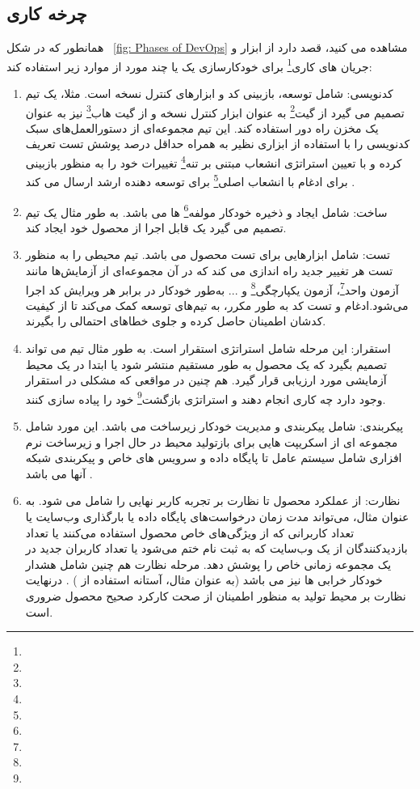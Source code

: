 \subsection{چرخه کاری }
همانطور که در شکل 
~\ref{fig: Phases of DevOps}
مشاهده می کنید،
قصد دارد از ابزار و جریان های کاری\footnote{} برای خودکارسازی یک یا چند مورد از موارد زیر استفاده کند: 
\begin{enumerate}
	\item
کدنویسی: شامل توسعه، بازبینی کد و ابزارهای کنترل نسخه است. مثلا، یک تیم تصمیم می گیرد از گیت\footnote{} به عنوان ابزار کنترل نسخه و از گیت هاب\footnote{} نیز به عنوان یک مخزن راه دور استفاده کند. این تیم مجموعه‌ای از دستورالعمل‌های سبک کدنویسی را با استفاده از ابزاری نظیر  به همراه حداقل درصد پوشش تست تعریف کرده و با تعیین استراتژی انشعاب مبتنی بر تنه\footnote{} تغییرات خود را به منظور بازبینی برای ادغام با انشعاب اصلی\footnote{} برای توسعه دهنده ارشد ارسال می کند \cite{Devopstrunk}.
	\item 
ساخت: شامل ایجاد و ذخیره خودکار مولفه\footnote{} ها می باشد. به طور مثال یک تیم تصمیم می گیرد یک  قابل اجرا از محصول خود ایجاد کند.
	\item 
تست: شامل ابزارهایی برای تست محصول می باشد. تیم محیطی را به منظور تست هر تغییر جدید راه اندازی می کند که در آن مجموعه‌ای از آزمایش‌ها مانند آزمون واحد\footnote{}، آزمون یکپارچگی\footnote{} و ... به‌طور خودکار در برابر هر ویرایش کد اجرا می‌شود.ادغام و تست کد به طور مکرر، به تیم‌های توسعه کمک می‌کند تا از کیفیت کدشان اطمینان حاصل کرده و جلوی خطاهای احتمالی را بگیرند.
	\item 
استقرار: این مرحله شامل استراتژی استقرار است. به طور مثال تیم می تواند تصمیم بگیرد که یک محصول به طور مستقیم منتشر شود یا ابتدا در یک محیط آزمایشی مورد ارزیابی قرار گیرد. هم چنین در مواقعی که مشکلی در استقرار وجود دارد چه کاری انجام دهند و استراتژی بازگشت\footnote{} خود را پیاده سازی کنند.
	\item 
پیکربندی: شامل پیکربندی و مدیریت خودکار زیرساخت می باشد. این مورد شامل مجموعه ای از اسکریپت هایی برای بازتولید محیط در حال اجرا و زیرساخت نرم افزاری شامل سیستم عامل تا پایگاه داده و سرویس های خاص و پیکربندی شبکه آنها می باشد \cite{DevopsIaac1, DevopsIaac2}.
	\item 
نظارت: از عملکرد محصول تا نظارت بر تجربه کاربر نهایی را شامل می شود. به عنوان مثال، می‌تواند مدت زمان درخواست‌های پایگاه داده یا بارگذاری وب‌سایت یا تعداد کاربرانی که از ویژگی‌های خاص محصول استفاده می‌کنند یا تعداد بازدیدکنندگان از یک وب‌سایت که به ثبت نام ختم می‌شود یا تعداد کاربران جدید در یک مجموعه زمانی خاص را پوشش دهد. مرحله نظارت هم چنین شامل هشدار خودکار خرابی ها نیز می باشد (به عنوان مثال، آستانه استفاده از ) \cite{DevopsMonitor}. درنهایت نظارت بر محیط تولید به منظور اطمینان از صحت کارکرد صحیح محصول ضروری است.
\end{enumerate}

